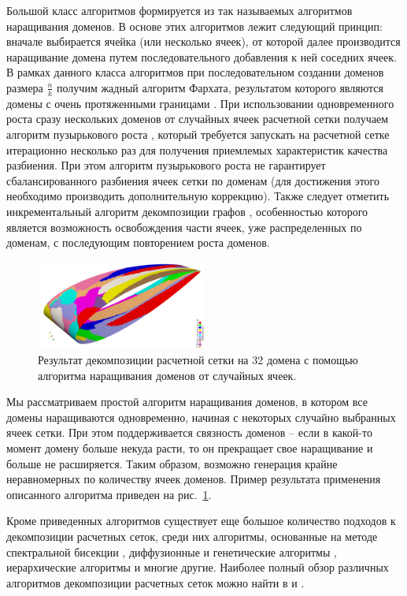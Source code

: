 Большой класс алгоритмов формируется из так называемых алгоритмов наращивания доменов.
В основе этих алгоритмов лежит следующий принцип: вначале выбирается ячейка (или несколько ячеек), от которой далее производится наращивание домена путем последовательного добавления к ней соседних ячеек.
В рамках данного класса алгоритмов при последовательном создании доменов размера $\frac{n}{k}$ получим жадный алгоритм Фархата, результатом которого являются домены с очень протяженными границами \cite{Farhat1988Decomp}.
При использовании одновременного роста сразу нескольких доменов от случайных ячеек расчетной сетки получаем алгоритм пузырькового роста \cite{Preis1997Decomp}, который требуется запускать на расчетной сетке итерационно несколько раз для получения приемлемых характеристик качества разбиения.
При этом алгоритм пузырькового роста не гарантирует сбалансированного разбиения ячеек сетки по доменам (для достижения этого необходимо производить дополнительную коррекцию).
Также следует отметить инкрементальный алгоритм декомпозиции графов \cite{Yakobovsky2005Decomp}, особенностью которого является возможность освобождения части ячеек, уже распределенных по доменам, с последующим повторением роста доменов.

\begin{figure}[ht]
	\centering
	\includegraphics[width=0.5\textwidth]{./pics/text_2_decompsurf/wing_rgrow_32.png}
	\caption{Результат декомпозиции расчетной сетки на 32 домена с помощью алгоритма наращивания доменов от случайных ячеек.}
	\label{fig:text_2_decompsurf_wing_rgrow_32}
\end{figure}

Мы рассматриваем простой алгоритм наращивания доменов, в котором все домены наращиваются одновременно, начиная с некоторых случайно выбранных ячеек сетки.
При этом поддерживается связность доменов -- если в какой-то момент домену больше некуда расти, то он прекращает свое наращивание и больше не расширяется.
Таким образом, возможно генерация крайне неравномерных по количеству ячеек доменов. Пример результата применения описанного алгоритма приведен на рис.~\ref{fig:text_2_decompsurf_wing_rgrow_32}.

Кроме приведенных алгоритмов существует еще большое количество подходов к декомпозиции расчетных сеток, среди них алгоритмы, основанные на методе спектральной бисекции \cite{Urschel2014Decomp}, диффузионные и генетические алгоритмы \cite{Zhao2019Decomp}, иерархические алгоритмы \cite{Kapyris1998Decomp} и многие другие.
Наиболее полный обзор различных алгоритмов декомпозиции расчетных сеток можно найти в \cite{Golovchenko2020Decomp} и \cite{Zheleznyakova2017Decomp}.

